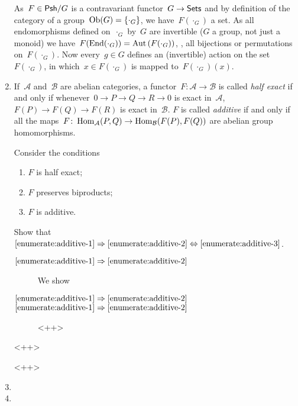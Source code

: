 \documentclass[a4paper,11pt,oneside,openany,article]{memoir}
\begin{document}
\begin{enumerate}
    \begin{solution}
      As~$F\in\mathsf{Psh}/G$ is a contravariant functor~$G\to\mathsf{Sets}$ and by definition of the category of a group~$\operatorname{Ob}(G)=\left\{ \cdot_G \right\}$, we have~$F(\cdot_G)$ a set. As all endomorphisms defined on~$\cdot_G$ by~$G$ are invertible ($G$ a group, not just a monoid) we have~$F(\operatorname{End}(\cdot_G))=\operatorname{Aut}\left( F(\cdot_G) \right)$, \ie, all bijections or permutations on~$F(\cdot_G)$. Now every~$g\in G$ defines an (invertible) action on the set~$F(\cdot_G)$, in which~$x\in F(\cdot_G)$ is mapped to~$F(\cdot_G)(x)$.
    \end{solution}

  \item If~$\mathcal{A}$ and~$\mathcal{B}$ are abelian categories, a functor~$F\colon\mathcal{A}\to\mathcal{B}$ is called \emph{half exact} if and only if whenever~$0\to P\to Q\to R\to 0$ is exact in~$\mathcal{A}$, $F(P)\to F(Q)\to F(R)$ is exact in~$\mathcal{B}$. $F$ is called \emph{additive} if and only if all the maps~$F\colon\operatorname{Hom}_{\mathcal{A}}(P,Q)\to\operatorname{Hom}_{\mathcal{B}}(F(P),F(Q))$ are abelian group homomorphisms.

    Consider the conditions
    \begin{enumerate}
      \item\label{enumerate:additive-1} $F$ is half exact;
      \item\label{enumerate:additive-2} $F$ preserves biproducts;
      \item\label{enumerate:additive-3} $F$ is additive.
    \end{enumerate}
    Show that~$\ref{enumerate:additive-1}\Rightarrow\ref{enumerate:additive-2}\Leftrightarrow\ref{enumerate:additive-3}$.

    \begin{solution}
      \begin{description}
        \item[$\ref{enumerate:additive-1}\Rightarrow\ref{enumerate:additive-2}$] We show
        \item[$\ref{enumerate:additive-1}\Rightarrow\ref{enumerate:additive-2}$]
        \item[$\ref{enumerate:additive-1}\Rightarrow\ref{enumerate:additive-2}$]<++>
      \end{description}<++>
    \end{solution}<++>

  \item 

  \item 


\end{enumerate}
\end{document}
